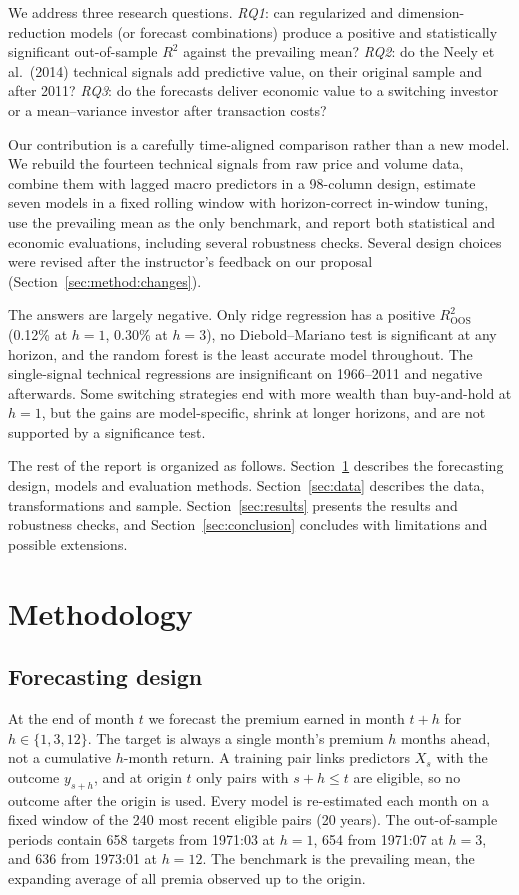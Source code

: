 \documentclass[11pt,a4paper]{article}
\begin{document}
We address three research questions. \emph{RQ1}: can regularized and
dimension-reduction models (or forecast combinations) produce a positive and
statistically significant out-of-sample $R^2$ against the prevailing mean?
\emph{RQ2}: do the Neely et al.\ (2014) technical signals add predictive
value, on their original sample and after 2011? \emph{RQ3}: do the forecasts
deliver economic value to a switching investor or a mean--variance investor
after transaction costs?

Our contribution is a carefully time-aligned comparison rather than a new
model. We rebuild the fourteen technical signals from raw price and volume
data, combine them with lagged macro predictors in a 98-column design,
estimate seven models in a fixed rolling window with horizon-correct
in-window tuning, use the prevailing mean as the only benchmark, and report
both statistical and economic evaluations, including several robustness
checks. Several design choices were revised after the instructor's feedback
on our proposal (Section~\ref{sec:method:changes}).

The answers are largely negative. Only ridge regression has a positive
$R^2_{\mathrm{OOS}}$ (0.12\% at $h=1$, 0.30\% at $h=3$), no Diebold--Mariano
test is significant at any horizon, and the random forest is the least
accurate model throughout. The single-signal technical regressions are
insignificant on 1966--2011 and negative afterwards. Some switching
strategies end with more wealth than buy-and-hold at $h=1$, but the gains
are model-specific, shrink at longer horizons, and are not supported by a
significance test.

The rest of the report is organized as follows. Section~\ref{sec:method}
describes the forecasting design, models and evaluation methods.
Section~\ref{sec:data} describes the data, transformations and sample.
Section~\ref{sec:results} presents the results and robustness checks, and
Section~\ref{sec:conclusion} concludes with limitations and possible
extensions.

\section{Methodology}\label{sec:method}

\subsection{Forecasting design}\label{sec:method:design}
At the end of month $t$ we forecast the premium earned in month $t+h$ for
$h\in\{1,3,12\}$. The target is always a single month's premium $h$ months
ahead, not a cumulative $h$-month return. A training pair links predictors
$X_s$ with the outcome $y_{s+h}$, and at origin $t$ only pairs with
$s+h\le t$ are eligible, so no outcome after the origin is used. Every
model is re-estimated each month on a fixed window of the 240 most recent
eligible pairs (20 years). The out-of-sample periods contain 658 targets
from 1971:03 at $h=1$, 654 from 1971:07 at $h=3$, and 636 from 1973:01 at
$h=12$. The benchmark is the prevailing mean, the expanding average of all
premia observed up to the origin.
\end{document}
